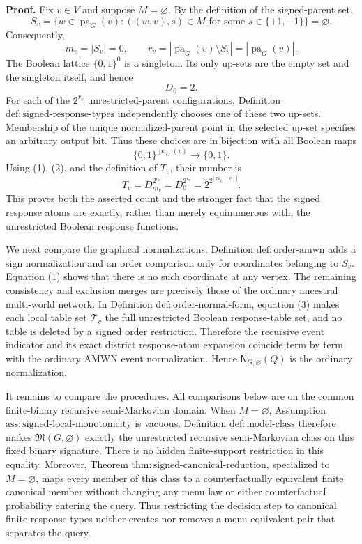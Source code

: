 \textbf{Proof.}
Fix \(v\in V\) and suppose \(M=\varnothing\).  By the definition of the signed-parent set,
\[
 S_v
 =\{w\in\operatorname{pa}_G(v):((w,v),s)\in M
       \text{ for some }s\in\{+1,-1\}\}
 =\varnothing.
\]
Consequently,
\[
 m_v=|S_v|=0,
 \qquad
 r_v=|\operatorname{pa}_G(v)\setminus S_v|
     =|\operatorname{pa}_G(v)|.
\tag{1}
\]
The Boolean lattice \(\{0,1\}^{0}\) is a singleton.  Its only up-sets are the empty set and the singleton itself, and hence
\[
 D_0=2.
\tag{2}
\]
For each of the \(2^{r_v}\) unrestricted-parent configurations, Definition \(\mathrm{def:signed\text{-}response\text{-}types}\) independently chooses one of these two up-sets.  Membership of the unique normalized-parent point in the selected up-set specifies an arbitrary output bit.  Thus these choices are in bijection with all Boolean maps
\[
 \{0,1\}^{\operatorname{pa}_G(v)}\longrightarrow\{0,1\}.
\]
Using (1), (2), and the definition of \(T_v\), their number is
\[
 T_v
 =D_{m_v}^{2^{r_v}}
 =D_0^{2^{r_v}}
 =2^{2^{|\operatorname{pa}_G(v)|}}.
\tag{3}
\]
This proves both the asserted count and the stronger fact that the signed response atoms are exactly, rather than merely equinumerous with, the unrestricted Boolean response functions.

We next compare the graphical normalizations.  Definition \(\mathrm{def:order\text{-}amwn}\) adds a sign normalization and an order comparison only for coordinates belonging to \(S_v\).  Equation (1) shows that there is no such coordinate at any vertex.  The remaining consistency and exclusion merges are precisely those of the ordinary ancestral multi-world network.  In Definition \(\mathrm{def:order\text{-}normal\text{-}form}\), equation (3) makes each local table set \(\mathcal T_v\) the full unrestricted Boolean response-table set, and no table is deleted by a signed order restriction.  Therefore the recursive event indicator and its exact district response-atom expansion coincide term by term with the ordinary AMWN event normalization.  Hence \(\mathsf N_{G,\varnothing}(Q)\) is the ordinary normalization.

It remains to compare the procedures.  All comparisons below are on the common finite-binary recursive semi-Markovian domain.  When \(M=\varnothing\), Assumption \(\mathrm{ass:signed\text{-}local\text{-}monotonicity}\) is vacuous.  Definition \(\mathrm{def:model\text{-}class}\) therefore makes \(\mathfrak M(G,\varnothing)\) exactly the unrestricted recursive semi-Markovian class on this fixed binary signature.  There is no hidden finite-support restriction in this equality.  Moreover, Theorem \(\mathrm{thm:signed\text{-}canonical\text{-}reduction}\), specialized to \(M=\varnothing\), maps every member of this class to a counterfactually equivalent finite canonical member without changing any menu law or either counterfactual probability entering the query.  Thus restricting the decision step to canonical finite response types neither creates nor removes a menu-equivalent pair that separates the query.


